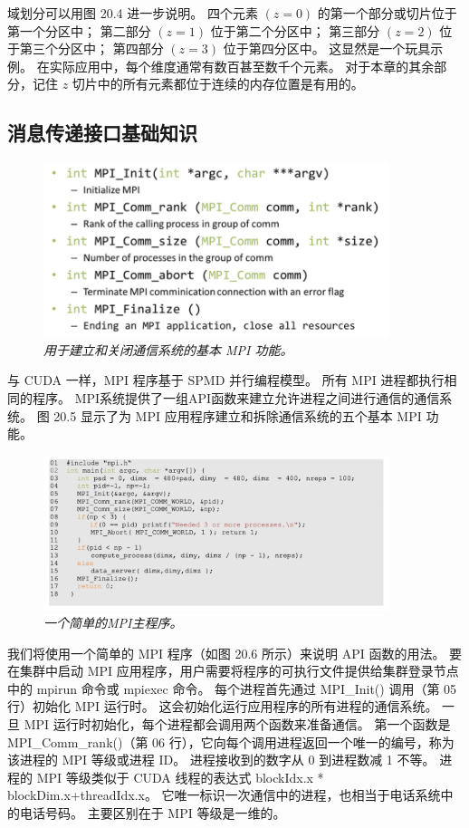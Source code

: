 域划分可以用图 20.4 进一步说明。 四个元素 $(z=0)$ 的第一个部分或切片位于第一个分区中； 
第二部分 $(z=1)$ 位于第二个分区中； 第三部分 $(z=2)$ 位于第三个分区中； 第四部分 $(z=3)$ 位于第四分区中。 
这显然是一个玩具示例。 在实际应用中，每个维度通常有数百甚至数千个元素。 
对于本章的其余部分，记住 $z$ 切片中的所有元素都位于连续的内存位置是有用的。

\subsection{消息传递接口基础知识}
\begin{figure}[H]
	\centering
	\includegraphics[width=0.9\textwidth]{figs/F20.5.png}
	\caption{\textit{用于建立和关闭通信系统的基本 MPI 功能。}}
\end{figure}

与 CUDA 一样，MPI 程序基于 SPMD 并行编程模型。 所有 MPI 进程都执行相同的程序。 
MPI系统提供了一组API函数来建立允许进程之间进行通信的通信系统。 
图 20.5 显示了为 MPI 应用程序建立和拆除通信系统的五个基本 MPI 功能。

\begin{figure}[H]
	\centering
	\includegraphics[width=0.9\textwidth]{figs/F20.6.png}
	\caption{\textit{一个简单的MPI主程序。}}
\end{figure}

我们将使用一个简单的 MPI 程序（如图 20.6 所示）来说明 API 函数的用法。 
要在集群中启动 MPI 应用程序，用户需要将程序的可执行文件提供给集群登录节点中的 mpirun 命令或 mpiexec 命令。 
每个进程首先通过 MPI\_Init() 调用（第 05 行）初始化 MPI 运行时。 这会初始化运行应用程序的所有进程的通信系统。 
一旦 MPI 运行时初始化，每个进程都会调用两个函数来准备通信。 
第一个函数是 MPI\_Comm\_rank()（第 06 行），它向每个调用进程返回一个唯一的编号，称为该进程的 MPI 等级或进程 ID。 
进程接收到的数字从 0 到进程数减 1 不等。 
进程的 MPI 等级类似于 CUDA 线程的表达式 blockIdx.x * blockDim.x+threadIdx.x。 
它唯一标识一次通信中的进程，也相当于电话系统中的电话号码。 
主要区别在于 MPI 等级是一维的。

